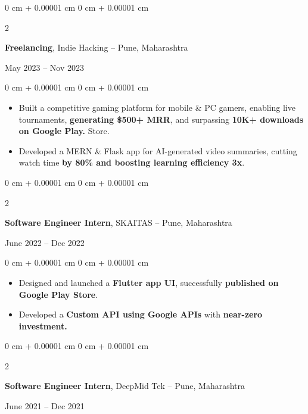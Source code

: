 \documentclass[10pt, letterpaper]{article}
\newenvironment{highlights}{
    \begin{itemize}[
        topsep=0.10 cm,
        parsep=0.10 cm,
        partopsep=0pt,
        itemsep=0pt,
        leftmargin=0 cm + 10pt,
        labelindent=0pt
    ]
}{
    \end{itemize}
} %
\newenvironment{onecolentry}{
    \begin{adjustwidth}{
        0 cm + 0.00001 cm
    }{
        0 cm + 0.00001 cm
    }
}{
    \end{adjustwidth}
} %
\newenvironment{twocolentry}[2][]{
    \onecolentry
    \def\secondColumn{#2}
    \setcolumnwidth{\fill, 4.5 cm}
    \begin{paracol}{2}
}{
    \switchcolumn \raggedleft \secondColumn
    \end{paracol}
    \endonecolentry
} %
\begin{document}
        \vspace{0.2 cm}

        \begin{twocolentry}{May 2023 – Nov 2023}
            \textbf{Freelancing}, Indie Hacking -- Pune, Maharashtra
        \end{twocolentry}

        \vspace{0.10 cm}
        \begin{onecolentry}
            \begin{highlights}
                \item Built a competitive gaming platform for mobile \& PC gamers, enabling live tournaments, \textbf{generating \$500+ MRR}, and surpassing \textbf{10K+ downloads on Google Play.} Store.
                \item Developed a MERN \& Flask app for AI-generated video summaries, cutting watch time \textbf{by 80\% and boosting learning efficiency 3x}.
            \end{highlights}
        \end{onecolentry}

        \vspace{0.2 cm}

        \begin{twocolentry}{June 2022 – Dec 2022}
            \textbf{Software Engineer Intern}, SKAITAS -- Pune, Maharashtra
        \end{twocolentry}

        \vspace{0.10 cm}
        \begin{onecolentry}
            \begin{highlights}
                \item Designed and launched a \textbf{Flutter app UI}, successfully \textbf{published on Google Play Store}.
                \item Developed a \textbf{Custom API using Google APIs} with \textbf{near-zero investment.}
            \end{highlights}
        \end{onecolentry}

        \vspace{0.2 cm}

        \begin{twocolentry}{June 2021 – Dec 2021}
            \textbf{Software Engineer Intern}, DeepMid Tek -- Pune, Maharashtra
        \end{twocolentry}
\end{document}
